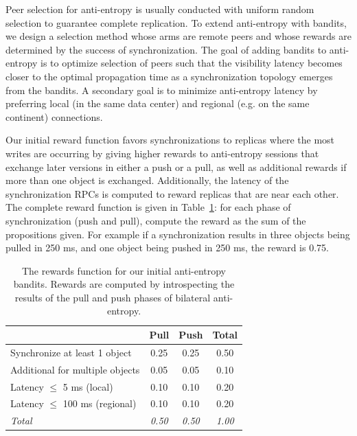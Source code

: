 Peer selection for anti-entropy is usually conducted with uniform random
selection to guarantee complete replication.
To extend anti-entropy with bandits, we design a selection method whose arms
are remote peers and whose rewards are determined by the success of
synchronization.
The goal of adding bandits to anti-entropy is to optimize selection of peers
such that the visibility latency becomes closer to the optimal propagation
time as a synchronization topology emerges from the bandits.
A secondary goal is to minimize anti-entropy latency by preferring local (in
the same data center) and regional (e.g. on the same continent) connections.

Our initial reward function favors synchronizations to replicas where the
most writes are occurring by giving higher rewards to anti-entropy sessions
that exchange later versions in either a push or a pull, as well as additional
rewards if more than one object is exchanged.
Additionally, the latency of the synchronization RPCs is computed to reward
replicas that are near each other.
The complete reward function is given in Table~\ref{tab:ch06_rewards}: for each
phase of synchronization (push and pull), compute the reward as the sum of the
propositions given.
For example if a synchronization results in three objects being pulled in
250 ms, and one object being pushed in 250 ms, the reward is 0.75.

\renewcommand{\baselinestretch}{1}
\small\normalsize
 \begin{table}[t!]
\caption[Bandit Reward Function]{The rewards function for our initial anti-entropy bandits. Rewards are computed by introspecting the results of the pull and push phases of bilateral anti-entropy.}
\begin{center}
\begin{tabular}{@{}l c c c @{}}
\hline
& \textbf{Pull} & \textbf{Push} & \textbf{Total} \\
\hline \hline
Synchronize at least 1 object & 0.25 & 0.25 & 0.50 \\
Additional for multiple objects  & 0.05 & 0.05 & 0.10 \\
Latency $\leq$ 5 ms (local)        & 0.10 & 0.10 & 0.20 \\
Latency $\leq$ 100 ms (regional)   & 0.10 & 0.10 & 0.20 \\
\hline
\textit{Total} & \textit{0.50} & \textit{0.50} & \textit{1.00} \\
\hline
\end{tabular}
\end{center}
\label{tab:ch06_rewards}
\end{table}
 \renewcommand{\baselinestretch}{2}
\small\normalsize

